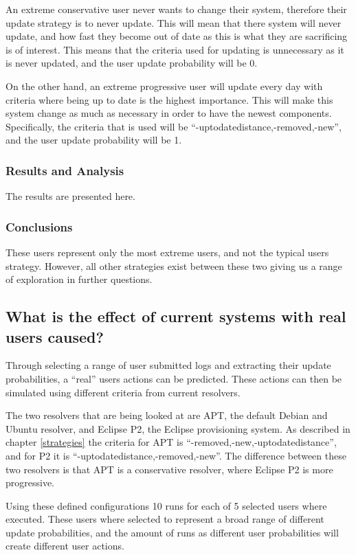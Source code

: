 An extreme conservative user never wants to change their system, therefore their update strategy is to never update.
This will mean that there system will never update, and how fast they become out of date as this is what they are sacrificing is of interest.
This means that the criteria used for updating is unnecessary as it is never updated, and the user update probability will be 0.

On the other hand, an extreme progressive user will update every day with criteria where being up to date is the highest importance.
This will make this system change as much as necessary in order to have the newest components.
Specifically, the criteria that is used will be ``-uptodatedistance,-removed,-new'', and the user update probability will be 1.

\subsubsection{Results and Analysis}
The results are presented here.

\subsubsection{Conclusions}
These users represent only the most extreme users, and not the typical users strategy.
However, all other strategies exist between these two giving us a range of exploration in further questions.

\subsection{What is the effect of current systems with real users caused?}
Through selecting a range of user submitted logs and extracting their update probabilities, a ``real'' users actions can be predicted.
These actions can then be simulated using different criteria from current resolvers.

The two resolvers that are being looked at are APT, the default Debian and Ubuntu resolver, and Eclipse P2, the Eclipse provisioning system.
As described in chapter \ref{strategies} the criteria for APT is ``-removed,-new,-uptodatedistance'', and for P2 it is ``-uptodatedistance,-removed,-new''.
The difference between these two resolvers is that APT is a conservative resolver, where Eclipse P2 is more progressive. 

Using these defined configurations 10 runs for each of 5 selected users where executed. 
These users where selected to represent a broad range of different update probabilities, and the amount of runs as different user probabilities will create different user actions.

